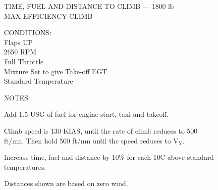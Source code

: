 \begin{figure}[t]
\begin{center}
\begin{perfhdr}TIME, FUEL AND DISTANCE TO CLIMB --- 1800 lb\\
MAX EFFICIENCY CLIMB\\
\end{perfhdr}
\Large

\normalsize
\vspace{5ex}
    \raggedright 
    CONDITIONS:\\
    Flaps UP\\
    2650 RPM\\
    Full Throttle\\
    Mixture Set to give Take-off EGT\\
    Standard Temperature\\
\hfill

\vspace{\perfnoteskip}
    \raggedright NOTES:
    \begin{enumerate*}
      \item Add 1.5 USG of fuel for engine start, taxi and takeoff.
      \item Climb speed is 130 KIAS, until the rate of climb reduces to 500 ft/mn.  Then hold 500 ft/mn until the speed reduces to $\mathrm{V_{Y}}$.
      \item Increase time, fuel and distance by 10\% for each 10\textdegree C above standard temperatures.
      \item Distances shown are based on zero wind.
      \end{enumerate*}
\vspace{\perfnoteskip}
\settowidth{\colOne}{WEIGHT}
\settowidth{\colTwo}{PRESSURE}
\settowidth{\colThree}{TEMP}
\settowidth{\colFour}{CLIMB}
\settowidth{\colFive}{RATE OF}
\settowidth{\colSix}{TIME}
\settowidth{\colSeven}{USED}
\settowidth{\colEight}{DIST.}


\end{center}
\end{figure}
